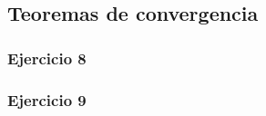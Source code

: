 \documentclass[11pt,spanish]{article} %
\begin{document}
\subsection{Teoremas de convergencia}
	\subsubsection{Ejercicio 8}
	
	\subsubsection{Ejercicio 9}
	
\end{document}
